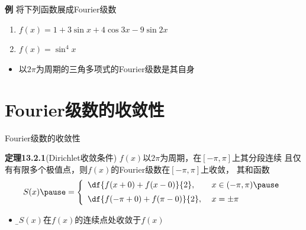 \begin{frame}
	\linespread{1.2}
	\begin{exampleblock}{{\bf 例}\hfill}
		将下列函数展成Fourier级数
		\begin{enumerate}
		  \item $f(x)=1+3\sin x+4\cos 3x-9\sin 2x$\pause
		  \item $f(x)=\sin^4x$\pause
		\end{enumerate}
	\end{exampleblock}
	\begin{itemize}
	  \item \alert{以$2\pi$为周期的三角多项式的Fourier级数是其自身}
	\end{itemize}
\end{frame}

\section{Fourier级数的收敛性}

\begin{frame}{Fourier级数的收敛性}
	\linespread{1.2}\pause 
	\begin{block}{{\bf 定理13.2.1}(Dirichlet收敛条件)\hfill}
		\pause $f(x)$以$2\pi$为周期，\pause 在$[-\pi,\pi]$上其\alert{分段连续}\pause 
		且\alert{仅有有限多个极值点}，\pause 则$f(x)$的Fourier级数在$[-\pi,\pi]$上收敛，
		\pause 其和函数
		$$S(x)\pause =\left\{\begin{array}{ll}
			\df{f(x+0)+f(x-0)}{2},\;& x\in(-\pi,\pi)\pause \\[5pt]
			\df{f(-\pi+0)+f(\pi-0)}{2},\;& x=\pm\pi
		\end{array}\right.$$
	\end{block}\pause 
	\begin{itemize}
	  \item {\b $S(x)$在$f(x)$的连续点处收敛于$f(x)$}
	\end{itemize}
\end{frame}


